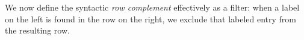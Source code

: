 \documentclass[authoryear, acmsmall, screen, review, nonacm]{acmart}
\begin{document}
\begin{code}[hide]%
\>[0]\AgdaSpace{}%
\AgdaSpace{}%
\AgdaInductiveConstructor{[]}\AgdaSpace{}%
\AgdaSymbol{=}\AgdaSpace{}%
\AgdaSpace{}%
\AgdaSpace{}%
\AgdaSymbol{\{}\AgdaSpace{}%
\AgdaSymbol{()}\AgdaSpace{}%
\AgdaSymbol{\})}\<%
\\
\>[0]\AgdaSpace{}%
\AgdaSpace{}%
\AgdaSymbol{((}\AgdaSpace{}%
\AgdaOperator{\AgdaInductiveConstructor{,}}\AgdaSpace{}%
\AgdaSymbol{\AgdaUnderscore{})}\AgdaSpace{}%
\AgdaSpace{}%
\AgdaSymbol{)}\AgdaSpace{}%
\AgdaSpace{}%
\AgdaSpace{}%
\AgdaSpace{}%
\<%
\\
\>[0]\AgdaSpace{}%
\AgdaSymbol{|}\AgdaSpace{}%
\AgdaSpace{}%
\AgdaSpace{}%
\AgdaSymbol{=}\AgdaSpace{}%
\AgdaSpace{}%
\<%
\\
\>[0]\AgdaSpace{}%
\AgdaSymbol{|}\AgdaSpace{}%
%
\>[10]\AgdaSpace{}%
\AgdaSpace{}%
\AgdaSpace{}%
\AgdaSpace{}%
\<%
\\
\>[0]%
\>[12]\AgdaSymbol{|}\AgdaSpace{}%
\AgdaSpace{}%
\AgdaSpace{}%
\AgdaSymbol{=}\AgdaSpace{}%
\AgdaSpace{}%
\AgdaSymbol{(}\AgdaSpace{}%
\AgdaSymbol{)}\<%
\\
\>[0]%
\>[12]\AgdaSymbol{|}\AgdaSpace{}%
%
\>[18]\AgdaSpace{}%
\AgdaSymbol{=}\AgdaSpace{}%
\AgdaSpace{}%
\AgdaSpace{}%
\AgdaSymbol{\{}\AgdaSpace{}%
\AgdaSpace{}%
\AgdaSpace{}%
\AgdaSpace{}%
\AgdaSpace{}%
\AgdaSymbol{;}\AgdaSpace{}%
\AgdaSymbol{(}\AgdaSpace{}%
\AgdaSymbol{)}\AgdaSpace{}%
\AgdaSpace{}%
\AgdaSpace{}%
\AgdaSpace{}%
\AgdaSymbol{\}}\<%
\end{code}

We now define the syntactic \emph{row complement} effectively as a filter: when a label on the left is found in the row on the right, we exclude that labeled entry from the resulting row.
\end{document}
